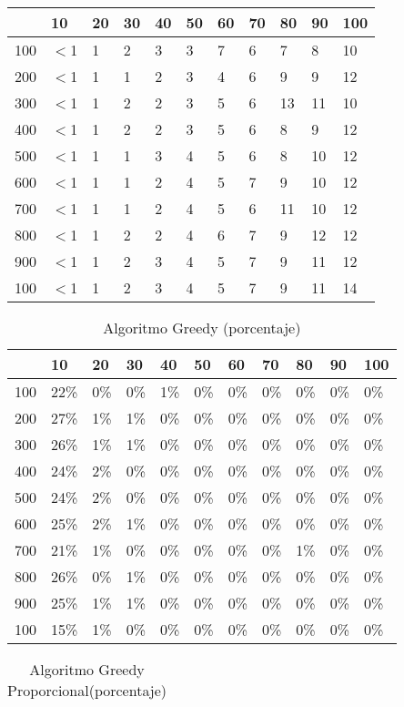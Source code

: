 \documentclass{article}
\begin{document}
\begin{center}
\begin{table}
\begin{tabularx}{0.8\textwidth}{|X|X|X|X|X|X|X|X|X|X|X|}
\hline &10&20&30&40&50&60&70&80&90&100\\
\hline 100&$<$1&1&2&3&3&7&6&7&8&10\\
\hline 200&$<$1&1&1&2&3&4&6&9&9&12\\
\hline 300&$<$1&1&2&2&3&5&6&13&11&10\\
\hline 400&$<$1&1&2&2&3&5&6&8&9&12\\
\hline 500&$<$1&1&1&3&4&5&6&8&10&12\\
\hline 600&$<$1&1&1&2&4&5&7&9&10&12\\
\hline 700&$<$1&1&1&2&4&5&6&11&10&12\\
\hline 800&$<$1&1&2&2&4&6&7&9&12&12\\
\hline 900&$<$1&1&2&3&4&5&7&9&11&12\\
\hline 100&$<$1&1&2&3&4&5&7&9&11&14\\
\hline
\end{tabularx}
\end{table}
\begin{table}
\centering
\caption{Algoritmo Greedy (porcentaje)}
\begin{tabularx}{0.8\textwidth}{|X|X|X|X|X|X|X|X|X|X|X|}
\hline &10&20&30&40&50&60&70&80&90&100\\
\hline 100&22\%&0\%&0\%&1\%&0\%&0\%&0\%&0\%&0\%&0\%\\
\hline 200&27\%&1\%&1\%&0\%&0\%&0\%&0\%&0\%&0\%&0\%\\
\hline 300&26\%&1\%&1\%&0\%&0\%&0\%&0\%&0\%&0\%&0\%\\
\hline 400&24\%&2\%&0\%&0\%&0\%&0\%&0\%&0\%&0\%&0\%\\
\hline 500&24\%&2\%&0\%&0\%&0\%&0\%&0\%&0\%&0\%&0\%\\
\hline 600&25\%&2\%&1\%&0\%&0\%&0\%&0\%&0\%&0\%&0\%\\
\hline 700&21\%&1\%&0\%&0\%&0\%&0\%&0\%&1\%&0\%&0\%\\
\hline 800&26\%&0\%&1\%&0\%&0\%&0\%&0\%&0\%&0\%&0\%\\
\hline 900&25\%&1\%&1\%&0\%&0\%&0\%&0\%&0\%&0\%&0\%\\
\hline 100&15\%&1\%&0\%&0\%&0\%&0\%&0\%&0\%&0\%&0\%\\
\hline
\end{tabularx}
\end{table}
\begin{table}
\centering
\caption{Algoritmo Greedy Proporcional(porcentaje)}
\begin{tabularx}{0.8\textwidth}{|X|X|X|X|X|X|X|X|X|X|X|}

\end{tabularx}
\end{table}
\end{center}
\end{document}
